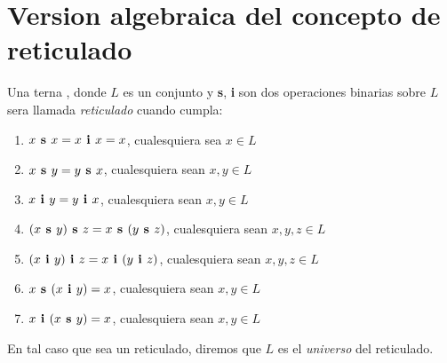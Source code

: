 
\section{Version algebraica del concepto de reticulado}
\begin{definition}
  Una terna \reticulAlg, donde $L$ es un conjunto y \textbf{s}, \textbf{i} son dos operaciones
  binarias sobre $L$ sera llamada \emph{reticulado} cuando cumpla:
  \begin{enumerate}
    \item $x\textbf{ s }x = x\textbf{ i }x = x$, cualesquiera sea $x \in L$
    \item $x\textbf{ s }y = y\textbf{ s }x$, cualesquiera sean $x,y \in L$
    \item $x\textbf{ i }y = y\textbf{ i }x$, cualesquiera sean $x,y \in L$
    \item $(x\textbf{ s }y)\textbf{ s }z = x\textbf{ s }(y\textbf{ s }z)$, cualesquiera sean $x,y,z \in L$
    \item $(x\textbf{ i }y)\textbf{ i }z = x\textbf{ i }(y\textbf{ i }z)$, cualesquiera sean $x,y,z \in L$
    \item $x\textbf{ s }(x\textbf{ i }y) = x$, cualesquiera sean $x,y \in L$
    \item $x\textbf{ i }(x\textbf{ s }y) = x$, cualesquiera sean $x,y \in L$
  \end{enumerate}

  En tal caso que \reticulAlg sea un reticulado, diremos que $L$ es el \emph{universo} del reticulado.
\end{definition}

